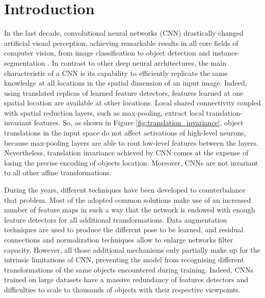\documentclass{article}
\begin{document}
\section{Introduction}
In the last decade, convolutional neural networks (CNN) drastically changed artificial visual perception, achieving remarkable results in all core fields of computer vision, from image classification \cite{krizhevsky2017imagenet,he2016deep,hu2018squeeze} to object detection \cite{redmon2016you,liu2016ssd,mazzia2020real} and instance segmentation \cite{he2017mask}. In contrast to other deep neural architectures, the main characteristic of a CNN is its capability to efficiently replicate the same knowledge at all locations in the spatial dimension of an input image. Indeed, using translated replicas of learned feature detectors, features learned at one spatial location are available at other locations. Local shared connectivity coupled with spatial reduction layers, such as max-pooling, extract local translation-invariant features. So, as shown in Figure \ref{fig:translation_invariance}, object translations in the input space do not affect activations of high-level neurons, because max-pooling layers are able to rout low-level features between the layers. Nevertheless, translation invariance achieved by CNN comes at the expense of losing the precise encoding of objects location. Moreover, CNNs are not invariant to all other affine transformations.

During the years, different techniques have been developed to counterbalance that problem. Most of the adopted common solutions make use of an increased number of feature maps in such a way that the network is endowed with enough feature detectors for all additional transformations. Data augmentation techniques are used to produce the different pose to be learned, and residual connections and normalization techniques allow to enlarge networks filter capacity. However, all those additional mechanisms only partially make up for the intrinsic limitations of CNN, preventing the model from recognising different transformations of the same objects encountered during training. Indeed, CNNs trained on large datasets have a massive redundancy of features detectors and difficulties to scale to thousands of objects with their respective viewpoints.
\end{document}
